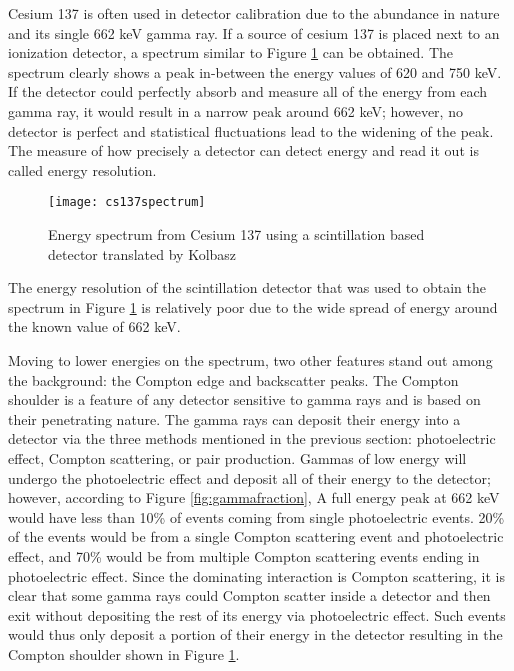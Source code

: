 Cesium 137 is often used in detector calibration due to the abundance in nature and its single 662 keV gamma ray.
If a source of cesium 137 is placed next to an ionization detector, a spectrum similar to Figure \ref{fig:cs137spectrum} can be obtained.
The spectrum clearly shows a peak in-between the energy values of 620 and 750 keV.
If the detector could perfectly absorb and measure all of the energy from each gamma ray, it would result in a narrow peak around 662 keV; however, no detector is perfect and statistical fluctuations lead to the widening of the peak.
The measure of how precisely a detector can detect energy and read it out is called energy resolution.
\begin{figure}[htpb]
\centering
\texttt{[image: cs137spectrum]}
\caption{Energy spectrum from Cesium 137 using a scintillation based detector \cite{CS137SPEC} translated by Kolbasz}
\label{fig:cs137spectrum}
\end{figure}
The energy resolution of the scintillation detector that was used to obtain the spectrum in Figure \ref{fig:cs137spectrum} is relatively poor due to the wide spread of energy around the known value of 662 keV.

Moving to lower energies on the spectrum, two other features stand out among the background: the Compton edge and backscatter peaks.
The Compton shoulder is a feature of any detector sensitive to gamma rays and is based on their penetrating nature.
The gamma rays can deposit their energy into a detector via the three methods mentioned in the previous section: photoelectric effect, Compton scattering, or pair production.
Gammas of low energy will undergo the photoelectric effect and deposit all of their energy to the detector; however, according to Figure \ref{fig:gammafraction}, A full energy peak at 662 keV would have less than 10\% of events coming from single photoelectric events.
20\% of the events would be from a single Compton scattering event and photoelectric effect, and 70\% would be from multiple Compton scattering events ending in photoelectric effect.
Since the dominating interaction is Compton scattering, it is clear that some gamma rays could Compton scatter inside a detector and then exit without depositing the rest of its energy via photoelectric effect.
Such events would thus only deposit a portion of their energy in the detector resulting in the Compton shoulder shown in Figure \ref{fig:cs137spectrum}.

